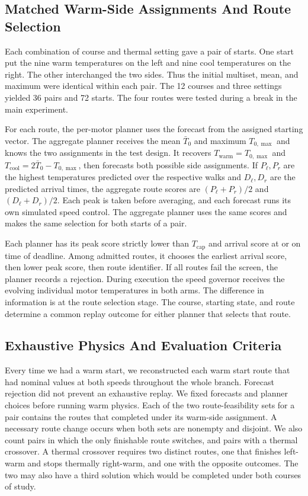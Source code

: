 \documentclass{ieeeaccess}
\begin{document}
\subsection{Matched Warm-Side Assignments And Route Selection}

Each combination of course and thermal setting gave a pair of starts. One start put the nine warm temperatures on the left and nine cool temperatures on the right. The other interchanged the two sides. Thus the initial multiset, mean, and maximum were identical within each pair. The 12 courses and three settings yielded 36 pairs and 72 starts. The four routes were tested during a break in the main experiment.

For each route, the per-motor planner uses the forecast from the assigned starting vector. The aggregate planner receives the mean $\bar T_0$ and maximum $T_{0,\max}$ and knows the two assignments in the test design. It recovers $T_{\mathrm{warm}}=T_{0,\max}$ and $T_{\mathrm{cool}}=2\bar T_0-T_{0,\max}$, then forecasts both possible side assignments. If $P_\ell,P_r$ are the highest temperatures predicted over the respective walks and $D_\ell,D_r$ are the predicted arrival times, the aggregate route scores are $(P_\ell+P_r)/2$ and $(D_\ell+D_r)/2$. Each peak is taken before averaging, and each forecast runs its own simulated speed control. The aggregate planner uses the same scores and makes the same selection for both starts of a pair.

Each planner has its peak score strictly lower than $T_{\mathrm{cap}}$ and arrival score at or on time of deadline. Among admitted routes, it chooses the earliest arrival score, then lower peak score, then route identifier. If all routes fail the screen, the planner records a rejection. During execution the speed governor receives the evolving individual motor temperatures in both arms. The difference in information is at the route selection stage. The course, starting state, and route determine a common replay outcome for either planner that selects that route.

\subsection{Exhaustive Physics And Evaluation Criteria}

Every time we had a warm start, we reconstructed each warm start route that had nominal values at both speeds throughout the whole branch. Forecast rejection did not prevent an exhaustive replay. We fixed forecasts and planner choices before running warm physics. Each of the two route-feasibility sets for a pair contains the routes that completed under its warm-side assignment. A necessary route change occurs when both sets are nonempty and disjoint. We also count pairs in which the only finishable route switches, and pairs with a thermal crossover. A thermal crossover requires two distinct routes, one that finishes left-warm and stops thermally right-warm, and one with the opposite outcomes. The two may also have a third solution which would be completed under both courses of study.
\end{document}
